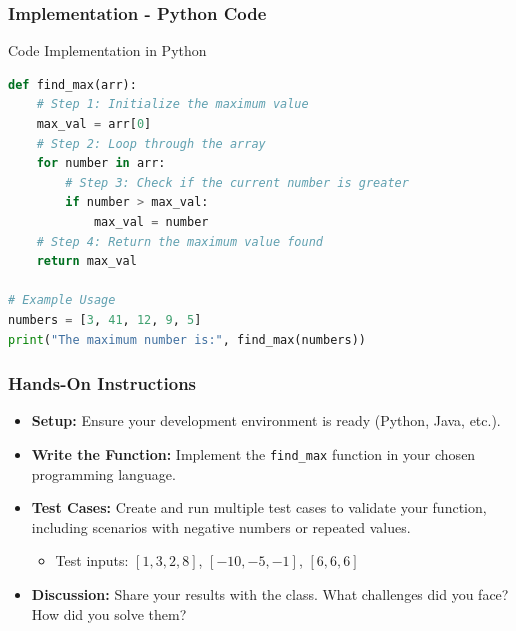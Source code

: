 \documentclass{beamer}
\begin{document}
\begin{frame}[fragile]
    \frametitle{Implementation - Python Code}
    \begin{block}{Code Implementation in Python}
        \begin{lstlisting}[language=Python]
def find_max(arr):
    # Step 1: Initialize the maximum value
    max_val = arr[0]
    # Step 2: Loop through the array
    for number in arr:
        # Step 3: Check if the current number is greater
        if number > max_val:
            max_val = number
    # Step 4: Return the maximum value found
    return max_val

# Example Usage
numbers = [3, 41, 12, 9, 5]
print("The maximum number is:", find_max(numbers))
        \end{lstlisting}
    \end{block}
\end{frame}

\begin{frame}[fragile]
    \frametitle{Hands-On Instructions}
    \begin{itemize}
        \item \textbf{Setup:} Ensure your development environment is ready (Python, Java, etc.).
        \item \textbf{Write the Function:} Implement the \texttt{find\_max} function in your chosen programming language.
        \item \textbf{Test Cases:} Create and run multiple test cases to validate your function, including scenarios with negative numbers or repeated values.
        \begin{itemize}
            \item Test inputs: \([1, 3, 2, 8]\), \([-10, -5, -1]\), \([6, 6, 6]\)
        \end{itemize}
        \item \textbf{Discussion:} Share your results with the class. What challenges did you face? How did you solve them?
    \end{itemize}
\end{frame}
\end{document}
